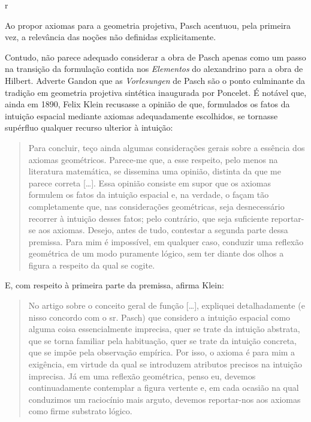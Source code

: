 r\documentclass{hipatia}
\begin{document}
Ao propor axiomas para a geometria projetiva, Pasch acentuou, pela primeira vez, a relevância das noções não definidas explicitamente. \cite[p. 859]{kleiner1999}

Contudo, não parece adequado considerar a obra de Pasch apenas como um passo na transição da formulação contida nos \emph{Elementos} do alexandrino para a obra de Hilbert. Adverte Gandon que as \emph{Vorlesungen} de Pasch são o ponto culminante da tradição em geometria projetiva sintética inaugurada por Poncelet.  \cite[p. 655--656]{gandon2005}                                                                                                             
É notável que, ainda em 1890, Felix Klein recusasse a opinião de que, formulados os fatos da intuição espacial mediante axiomas adequadamente escolhidos, se tornasse supérfluo qualquer recurso ulterior à intuição:
\begin{quote}
Para concluir, teço ainda algumas considerações gerais sobre a essência dos axiomas geométricos. Parece-me que, a esse respeito, pelo menos na literatura matemática, se dissemina uma opinião, distinta da que me parece correta [\dots]. Essa opinião consiste em supor que os axiomas formulem os fatos da intuição espacial e, na verdade, o façam tão completamente que, nas considerações geométricas, seja desnecessário recorrer à intuição desses fatos; pelo contrário, que seja suficiente reportar-se aos axiomas. Desejo, antes de tudo, contestar a segunda parte dessa premissa. Para mim é impossível, em qualquer caso, conduzir uma reflexão geométrica de um modo puramente lógico, sem ter diante dos olhos a figura a respeito da qual se cogite.  \cite[p. 380--381]{klein1890}
\end{quote}

E, com respeito à primeira parte da premissa, afirma Klein: 
\begin{quote}
No artigo sobre o conceito geral de função [\dots], expliquei detalhadamente (e nisso concordo com o sr. Pasch) que considero a intuição espacial como alguma coisa essencialmente imprecisa, quer se trate da intuição abstrata, que se torna familiar pela habituação, quer se trate da intuição concreta, que se impõe pela observação empírica. Por isso, o axioma é para mim a exigência, em virtude da qual se introduzem atributos precisos na intuição imprecisa. Já em uma reflexão geométrica, penso eu, devemos continuadamente contemplar a figura vertente e, em cada ocasião na qual conduzimos um raciocínio mais arguto, devemos reportar-nos aos axiomas como firme substrato lógico. \cite[p. 381]{klein1890}  
\end{quote}
\end{document}
